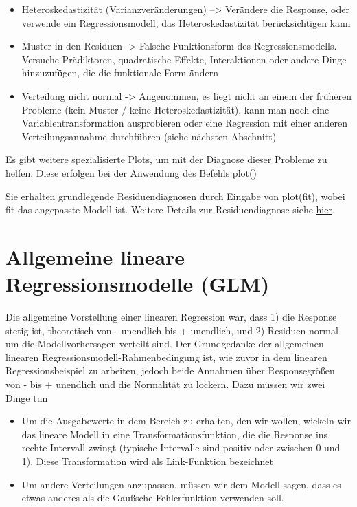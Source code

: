 \documentclass[a4paper,twoside]{tufte-book}\usepackage[]{graphicx}\usepackage[]{color}
\begin{document}
\begin{itemize}
  \item Heteroskedastizität (Varianzveränderungen) --> Verändere die Response, oder verwende ein Regressionsmodell, das Heteroskedastizität berücksichtigen kann
  \item Muster in den Residuen -> Falsche Funktionsform des Regressionsmodells. Versuche Prädiktoren, quadratische Effekte, Interaktionen oder andere Dinge hinzuzufügen, die die funktionale Form ändern
  \item Verteilung nicht normal -> Angenommen, es liegt nicht an einem der früheren Probleme (kein Muster / keine Heteroskedastizität), kann man noch eine Variablentransformation ausprobieren oder eine Regression mit einer anderen Verteilungsannahme durchführen (siehe nächsten Abschnitt)
\end{itemize}  

Es gibt weitere spezialisierte Plots, um mit der Diagnose dieser Probleme zu helfen. Diese erfolgen bei der Anwendung des Befehls plot()


Sie erhalten grundlegende Residuendiagnosen durch Eingabe von plot(fit), wobei fit das angepasste Modell ist. Weitere Details zur Residuendiagnose siehe \href{http://www.statmethods.net/stats/rdiagnostics.html}{hier}.



\section{Allgemeine lineare Regressionsmodelle (GLM)}

Die allgemeine Vorstellung einer linearen Regression war, dass 1) die Response stetig ist, theoretisch von - unendlich bis + unendlich, und 2) Residuen normal um die Modellvorhersagen verteilt sind. Der Grundgedanke der allgemeinen linearen Regressionsmodell-Rahmenbedingung ist, wie zuvor in dem linearen Regressionsbeispiel zu arbeiten, jedoch beide Annahmen über Responsegrößen von - bis + unendlich und die Normalität zu lockern. Dazu müssen wir zwei Dinge tun

\begin{itemize}
  \item Um die Ausgabewerte in dem Bereich zu erhalten, den wir wollen, wickeln wir das lineare Modell in eine Transformationsfunktion, die die Response ins rechte Intervall zwingt (typische Intervalle sind positiv oder zwischen 0 und 1). Diese Transformation wird als Link-Funktion bezeichnet
  \item Um andere Verteilungen anzupassen, müssen wir dem Modell sagen, dass es etwas anderes als die Gaußsche Fehlerfunktion verwenden soll.
\end{itemize}    
   
\end{document}
